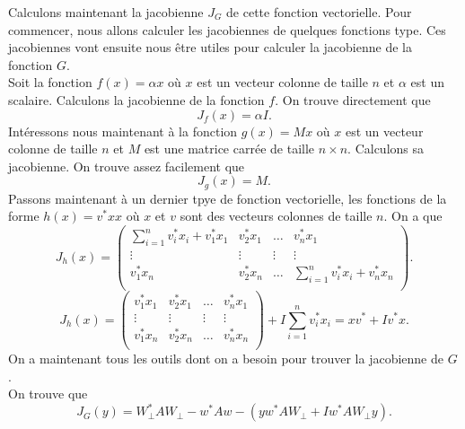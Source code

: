 Calculons maintenant la jacobienne $J_G$ de cette fonction vectorielle. Pour commencer, nous allons calculer les jacobiennes de quelques fonctions type. Ces jacobiennes vont ensuite nous être utiles pour calculer la jacobienne de la fonction $G$.\\
Soit la fonction $f(x) = \alpha x$ où $x$ est un vecteur colonne de taille $n$ et $\alpha$ est un scalaire. Calculons la jacobienne de la fonction $f$. On trouve directement que $$J_f(x) = \alpha I.$$
Intéressons nous maintenant à la fonction $g(x) = Mx$ où $x$ est un vecteur colonne de taille $n$ et $M$ est une matrice carrée de taille $n \times n$. Calculons sa jacobienne. On trouve assez facilement que $$J_g(x) = M.$$
Passons maintenant à un dernier tpye de fonction vectorielle, les fonctions de la forme $h(x) = v^* x x$ où $x$ et $v$ sont des vecteurs colonnes de taille $n$. On a que 
$$J_h(x) =
\left(\begin{array}{cccc}
\sum_{i=1}^{n}{v_i^* x_i} + v_1^* x_1 & v_2^* x_1 & \hdots & v_n^* x_1 \\
\vdots & \vdots & \vdots & \vdots\\
v_1^* x_n & v_2^* x_n & \hdots & \sum_{i=1}^{n}{v_i^* x_i} + v_n^* x_n \\
\end{array}\right).$$
$$J_h(x) =
\left(\begin{array}{cccc}
v_1^* x_1 & v_2^* x_1 & \hdots & v_n^* x_1 \\
\vdots & \vdots & \vdots & \vdots\\
v_1^* x_n & v_2^* x_n & \hdots & v_n^* x_n \\
\end{array}\right) + I\sum_{i=1}^{n}{v_i^* x_i} = xv^*+Iv^*x.
$$
On a maintenant tous les outils dont on a besoin pour trouver la jacobienne de $G$.\\
On trouve que $$J_G(y) = W_{\bot}^*AW_{\bot} - w^*Aw - (yw^*AW_{\bot}+Iw^*AW_{\bot}y).$$

















 